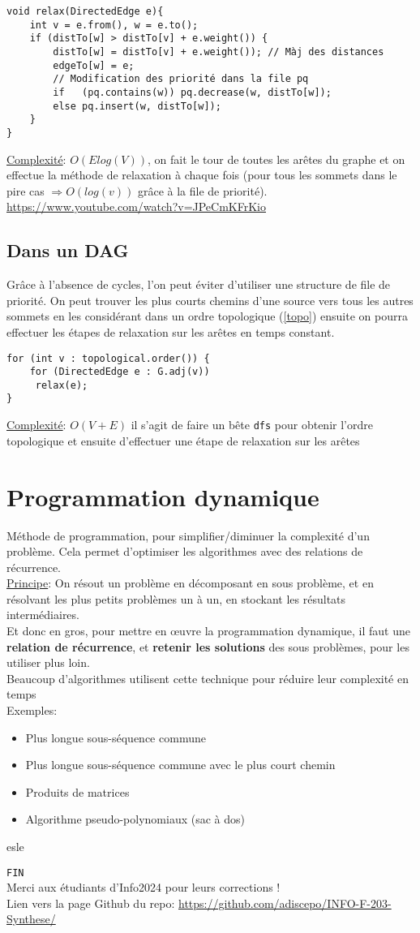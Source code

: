 \documentclass[10pt]{article}
\begin{document}
\begin{verbatim}
void relax(DirectedEdge e){
	int v = e.from(), w = e.to();
	if (distTo[w] > distTo[v] + e.weight()) {
		distTo[w] = distTo[v] + e.weight()); // Màj des distances
		edgeTo[w] = e;
		// Modification des priorité dans la file pq
		if   (pq.contains(w)) pq.decrease(w, distTo[w]); 
		else pq.insert(w, distTo[w]);
	}
}
\end{verbatim}

\underline{Complexité}: $O(Elog(V))$, on fait le tour de toutes les arêtes du graphe et on effectue la méthode de relaxation à chaque fois (pour tous les sommets dans le pire cas $\Rightarrow O(log(v))$ grâce à la file de priorité).
\\\url{https://www.youtube.com/watch?v=JPeCmKFrKio}

\subsection{Dans un DAG}
Grâce à l'absence de cycles, l'on peut éviter d'utiliser une structure de file de priorité. On peut trouver les plus courts chemins d'une source vers tous les autres sommets en les considérant dans un ordre topologique (\ref{topo}) ensuite on pourra effectuer les étapes de relaxation sur les arêtes en temps constant.

\begin{verbatim}
for (int v : topological.order()) {
    for (DirectedEdge e : G.adj(v))
	 relax(e);
}
\end{verbatim}
\underline{Complexité}: $O(V + E)$ il s'agit de faire un bête \verb|dfs| pour obtenir l'ordre topologique et ensuite d'effectuer une étape de relaxation sur les arêtes
\section{Programmation dynamique}
Méthode de programmation, pour simplifier/diminuer la complexité d’un problème. Cela permet d’optimiser les algorithmes avec des relations de récurrence.
\\\underline{Principe}: On résout un problème en décomposant en sous problème, et en résolvant les plus petits problèmes un à un, en stockant les résultats intermédiaires.
\\Et donc en gros, pour mettre en œuvre la programmation dynamique, il faut une \textbf{relation de récurrence}, et \textbf{retenir les solutions} des sous problèmes, pour les utiliser plus loin.
\\Beaucoup d'algorithmes utilisent cette technique pour réduire leur complexité en temps
\\Exemples:
\begin{itemize}
\item Plus longue sous-séquence commune
\item Plus longue sous-séquence commune avec le plus court chemin
\item Produits de matrices
\item Algorithme pseudo-polynomiaux (sac à dos)
\end{itemize}esle

\verb|FIN|\\
Merci aux étudiants d'Info2024 pour leurs corrections !
\\Lien vers la page Github du repo: \url{https://github.com/adiscepo/INFO-F-203-Synthese/}
\end{document}
